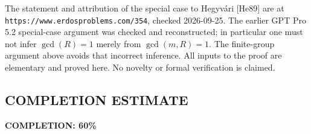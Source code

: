 The statement and attribution of the special case to Hegyv\'ari [He89]
are at \texttt{https://www.erdosproblems.com/354}, checked 2026-09-25.
The earlier GPT Pro 5.2 special-case argument was checked and
reconstructed; in particular one must not infer $\gcd(R)=1$ merely
from $\gcd(m,R)=1$. The finite-group argument above avoids that
incorrect inference. All inputs to the proof are elementary and
proved here. No novelty or formal verification is claimed.
\subsection*{COMPLETION ESTIMATE}
\textbf{COMPLETION: 60\%}
